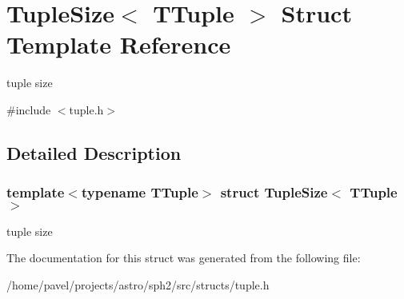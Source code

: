 \hypertarget{structTupleSize}{}\section{Tuple\+Size$<$ T\+Tuple $>$ Struct Template Reference}
\label{structTupleSize}


tuple size  




{\ttfamily \#include $<$tuple.\+h$>$}



\subsection{Detailed Description}
\subsubsection*{template$<$typename T\+Tuple$>$\newline
struct Tuple\+Size$<$ T\+Tuple $>$}

tuple size 

The documentation for this struct was generated from the following file\+:\begin{DoxyCompactItemize}
\item 
/home/pavel/projects/astro/sph2/src/structs/tuple.\+h\end{DoxyCompactItemize}
